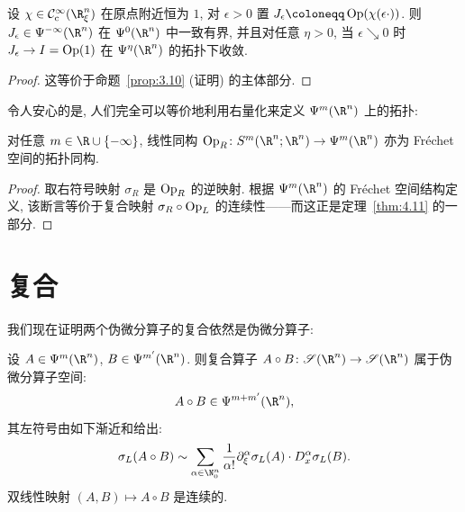 \begin{lemma}[磨光子]\label{lem:4.20}
设 $\chi \in \SmoothComp(\R_\xi^n)$ 在原点附近恒为 $1$, 对 $\epsilon > 0$ 置 $J_\epsilon \defeq \Op(\chi(\epsilon \cdot))$. 则 $J_\epsilon \in \Psi^{-\infty}(\R^n)$ 在 $\Psi^0(\R^n)$ 中一致有界, 并且对任意 $\eta > 0$, 当 $\epsilon \searrow 0$ 时 $J_\epsilon \to I = \operatorname{Op}(1)$ 在 $\Psi^\eta(\R^n)$ 的拓扑下收敛.
\end{lemma}

\begin{proof}
这等价于命题~\ref{prop:3.10} (证明) 的主体部分.
\end{proof}

令人安心的是, 人们完全可以等价地利用右量化来定义 $\Psi^m(\R^n)$ 上的拓扑:

\begin{proposition}\label{prop:4.21}
对任意 $m \in \R \cup \{-\infty\}$, 线性同构 $\Op_R \colon S^m(\R^n; \R^n) \to \Psi^m(\R^n)$ 亦为 Fréchet 空间的拓扑同构.
\end{proposition}

\begin{proof}
取右符号映射 $\sigma_R$ 是 $\operatorname{Op}_R$ 的逆映射. 根据 $\Psi^m(\R^n)$ 的 Fréchet 空间结构定义, 该断言等价于复合映射 $\sigma_R \circ \operatorname{Op}_L$ 的连续性——而这正是定理~\ref{thm:4.11} 的一部分.
\end{proof}

\section{复合}\label{sec:4.4}
%

我们现在证明两个伪微分算子的复合依然是伪微分算子:

\begin{theorem}[伪微分算子的复合定理]\label{thm:4.22}
设 $A \in \Psi^m(\R^n)$, $B \in \Psi^{m'}(\R^n)$. 则复合算子 $A \circ B \colon \Schwartz(\R^n) \to \Schwartz(\R^n)$ 属于伪微分算子空间:
\begin{equation}\label{eq:4.85}
    A \circ B \in \Psi^{m+m'}(\R^n),
\end{equation}
其左符号由如下渐近和给出:
\begin{equation}\label{eq:4.86}
    \sigma_L(A \circ B) \sim \sum_{\alpha \in \N_0^n} \frac{1}{\alpha!} \partial_\xi^\alpha \sigma_L(A) \cdot D_x^\alpha \sigma_L(B).
\end{equation}
双线性映射 $(A, B) \mapsto A \circ B$ 是连续的.
\end{theorem}

